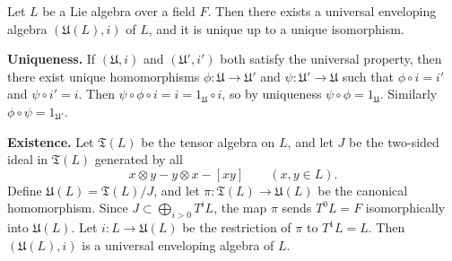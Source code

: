 Let $L$ be a Lie algebra over a field $F$. Then there exists a universal enveloping algebra $(\mathfrak{U}(L), i)$ of $L$, and it is unique up to a unique isomorphism.

\textbf{Uniqueness.} If $(\mathfrak{U}, i)$ and $(\mathfrak{U}', i')$ both satisfy the universal property, then there exist unique homomorphisms $\phi: \mathfrak{U} \to \mathfrak{U}'$ and $\psi: \mathfrak{U}' \to \mathfrak{U}$ such that $\phi \circ i = i'$ and $\psi \circ i' = i$. Then $\psi \circ \phi \circ i = i = 1_{\mathfrak{U}} \circ i$, so by uniqueness $\psi \circ \phi = 1_{\mathfrak{U}}$. Similarly $\phi \circ \psi = 1_{\mathfrak{U}'}$.

\textbf{Existence.} Let $\mathfrak{T}(L)$ be the tensor algebra on $L$, and let $J$ be the two-sided ideal in $\mathfrak{T}(L)$ generated by all
$$x \otimes y - y \otimes x - [xy] \qquad (x, y \in L).$$
Define $\mathfrak{U}(L) = \mathfrak{T}(L)/J$, and let $\pi: \mathfrak{T}(L) \to \mathfrak{U}(L)$ be the canonical homomorphism. Since $J \subset \bigoplus_{i > 0} T^i L$, the map $\pi$ sends $T^0L = F$ isomorphically into $\mathfrak{U}(L)$. Let $i: L \to \mathfrak{U}(L)$ be the restriction of $\pi$ to $T^1 L = L$. Then $(\mathfrak{U}(L), i)$ is a universal enveloping algebra of $L$.

